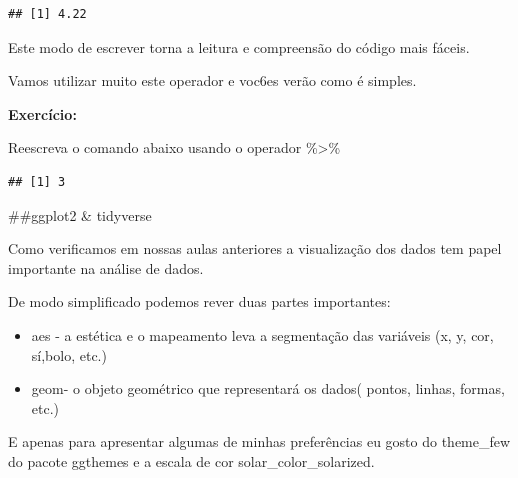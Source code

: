 \documentclass[
]{article}
\newenvironment{Shaded}{\begin{snugshade}}{\end{snugshade}}
\newcommand{\AttributeTok}[1]{\textcolor[rgb]{0.77,0.63,0.00}{#1}}
\newcommand{\CommentTok}[1]{\textcolor[rgb]{0.56,0.35,0.01}{\textit{#1}}}
\newcommand{\DecValTok}[1]{\textcolor[rgb]{0.00,0.00,0.81}{#1}}
\newcommand{\FunctionTok}[1]{\textcolor[rgb]{0.00,0.00,0.00}{#1}}
\newcommand{\NormalTok}[1]{#1}
\newcommand{\SpecialCharTok}[1]{\textcolor[rgb]{0.00,0.00,0.00}{#1}}
\begin{document}
\begin{Shaded}
\end{Shaded}

\begin{verbatim}
## [1] 4.22
\end{verbatim}

Este modo de escrever torna a leitura e compreensão do código mais
fáceis.

Vamos utilizar muito este operador e voc6es verão como é simples.

\textbf{Exercício:}

Reescreva o comando abaixo usando o operador \%\textgreater\%

\begin{Shaded}
\end{Shaded}

\begin{verbatim}
## [1] 3
\end{verbatim}

\#\#ggplot2 \& tidyverse

Como verificamos em nossas aulas anteriores a visualização dos dados tem
papel importante na análise de dados.

De modo simplificado podemos rever duas partes importantes:

\begin{itemize}
\item
  aes - a estética e o mapeamento leva a segmentação das variáveis (x,
  y, cor, sí,bolo, etc.)
\item
  geom- o objeto geométrico que representará os dados( pontos, linhas,
  formas, etc.)
\end{itemize}

E apenas para apresentar algumas de minhas preferências eu gosto do
theme\_few do pacote ggthemes e a escala de cor solar\_color\_solarized.
\end{document}
